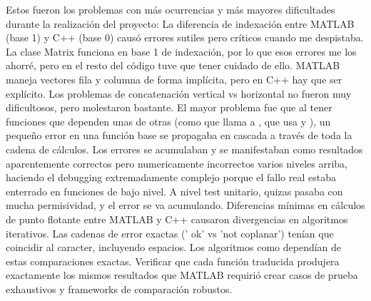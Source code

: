 \markdownRendererDocumentBegin
\markdownRendererSectionBegin
{}\markdownRendererInterblockSeparator
{}Estos fueron los problemas con más ocurrencias y más mayores dificultades durante la realización del proyecto:\markdownRendererInterblockSeparator
{}\markdownRendererSectionBegin
{}\markdownRendererInterblockSeparator
{}La diferencia de indexación entre MATLAB (base 1) y C++ (base 0) causó errores sutiles pero críticos cuando me despistaba. La clase Matrix funciona en base 1 de indexación, por lo que esos errores me los ahorré, pero en el resto del código tuve que tener cuidado de ello.\markdownRendererInterblockSeparator
{}
\markdownRendererSectionEnd \markdownRendererSectionBegin
{}\markdownRendererInterblockSeparator
{}MATLAB maneja vectores fila y columna de forma implícita, pero en C++ hay que ser explícito. Los problemas de concatenación vertical vs horizontal no fueron muy dificultosos, pero molestaron bastante.\markdownRendererInterblockSeparator
{}
\markdownRendererSectionEnd \markdownRendererSectionBegin
{}\markdownRendererInterblockSeparator
{}El mayor problema fue que al tener funciones que dependen unas de otras (como  que llama a , que usa  y ), un pequeño error en una función base se propagaba en cascada a través de toda la cadena de cálculos. Los errores se acumulaban y se manifestaban como resultados aparentemente correctos pero numericamente incorrectos varios niveles arriba, haciendo el debugging extremadamente complejo porque el fallo real estaba enterrado en funciones de bajo nivel. A nivel test unitario, quizas pasaba con mucha permisividad, y el error se va acumulando.\markdownRendererInterblockSeparator
{}
\markdownRendererSectionEnd \markdownRendererSectionBegin
{}\markdownRendererInterblockSeparator
{}Diferencias mínimas en cálculos de punto flotante entre MATLAB y C++ causaron divergencias en algoritmos iterativos.\markdownRendererInterblockSeparator
{}
\markdownRendererSectionEnd \markdownRendererSectionBegin
{}\markdownRendererInterblockSeparator
{}Las cadenas de error exactas (' ok' vs 'not coplanar') tenían que coincidir al caracter, incluyendo espacios. Los algoritmos como  dependían de estas comparaciones exactas.\markdownRendererInterblockSeparator
{}
\markdownRendererSectionEnd \markdownRendererSectionBegin
{}\markdownRendererInterblockSeparator
{}Verificar que cada función traducida produjera exactamente los mismos resultados que MATLAB requirió crear casos de prueba exhaustivos y frameworks de comparación robustos.
\markdownRendererSectionEnd 
\markdownRendererSectionEnd \markdownRendererDocumentEnd
